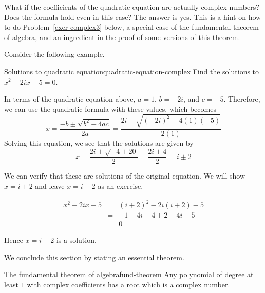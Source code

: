 What if the coefficients of the quadratic equation are actually complex
numbers? Does the formula hold even in this case? The answer is yes. This is
a hint on how to do Problem~\ref{exer-complex3} below, a special case of the
fundamental theorem of algebra, and an ingredient in the proof of some
versions of this theorem. 

Consider the following example. 

\begin{example}{Solutions to quadratic equation}{quadratic-equation-complex}
Find the solutions to $x^{2}-2ix-5=0$.
\end{example}

\begin{solution}
In terms of the quadratic equation above, $a=1$, $b=-2i$, and $c=-5$.
Therefore, we can use the quadratic formula with these values, which becomes
\begin{equation*}
x=
\frac{-b\pm \sqrt{b^{2}-4ac}}{2a}
= 
\frac{2i \pm \sqrt{(-2i)^{2} - 4 (1)(-5)}}{2(1)}
\end{equation*}
Solving this equation, we see that the solutions are given by
\begin{equation*}
x=\frac{2i\pm \sqrt{-4+20}}{2}=\frac{2i\pm 4}{2}=i\pm 2
\end{equation*}

We can verify that these are solutions of the original equation. 
We will show $x = i + 2$ and leave $x = i-2$ as an exercise.

\begin{eqnarray*}
x^{2}-2ix-5
&=& (i+2)^2 - 2i (i+2) - 5 \\
&=& -1 + 4i + 4 + 2 - 4i - 5 \\
&=& 0
\end{eqnarray*}

Hence $x = i+2$ is a solution. 
\end{solution}

We conclude this section by stating an essential theorem.

\begin{theorem}{The fundamental theorem of algebra}{fund-theorem}
Any polynomial of degree at least $1$ with complex coefficients has a root which is a complex number.
\end{theorem}
